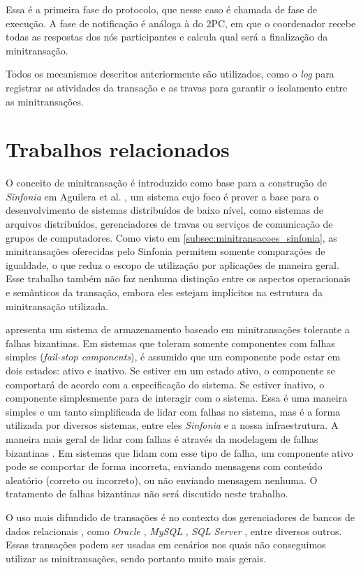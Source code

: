 \documentclass[11pt,twoside,a4paper]{book}
\begin{document}
Essa é a primeira fase do protocolo, que nesse caso é chamada de fase de execução. A fase de notificação é análoga à do 2PC, em que o coordenador recebe todas as respostas dos nós participantes e calcula qual será a finalização da minitransação.

Todos os mecanismos descritos anteriormente são utilizados, como o \emph{log} para registrar as atividades da transação e as travas para garantir o isolamento entre as minitransações.

\section{Trabalhos relacionados}
\label{sec:trabalhos_relacionados}
O conceito de minitransação é introduzido como base para a construção de \emph{Sinfonia} em Aguilera et al. \cite{sinfonia}, um sistema cujo foco é prover a base para o desenvolvimento de sistemas distribuídos de baixo nível, como sistemas de arquivos distribuídos, gerenciadores de travas ou serviços de comunicação de grupos de computadores. Como visto em \ref{subsec:minitransacoes_sinfonia}, as minitransações oferecidas pelo Sinfonia permitem somente comparações de igualdade, o que reduz o escopo de utilização por aplicações de maneira geral. Esse trabalho também não faz nenhuma distinção entre os aspectos operacionais e semânticos da transação, embora eles estejam implícitos na estrutura da minitransação utilizada.

\cite{padilha} apresenta um sistema de armazenamento baseado em minitransações tolerante a falhas bizantinas. Em sistemas que toleram somente componentes com falhas simples (\emph{fail-stop components}), é assumido que um componente pode estar em dois estados: ativo e inativo. Se estiver em um estado ativo, o componente se comportará de acordo com a especificação do sistema. Se estiver inativo, o componente simplesmente para de interagir com o sistema. Essa é uma maneira simples e um tanto simplificada de lidar com falhas no sistema, mas é a forma utilizada por diversos sistemas, entre eles \emph{Sinfonia} e a nossa infraestrutura. A maneira mais geral de lidar com falhas é através da modelagem de falhas bizantinas \cite{byzantine}. Em sistemas que lidam com esse tipo de falha, um componente ativo pode se comportar de forma incorreta, enviando mensagens com conteúdo aleatório (correto ou incorreto), ou não enviando mensagem nenhuma. O tratamento de falhas bizantinas não será discutido neste trabalho.

O uso mais difundido de transações é no contexto dos gerenciadores de bancos de dados relacionais \cite{vaca}, como \emph{Oracle} \cite{oracle}, \emph{MySQL} \cite{mysql}, \emph{SQL Server} \cite{sqlserver}, entre diversos outros. Essas transações podem ser usadas em cenários nos quais não conseguimos utilizar as minitransações, sendo portanto muito mais gerais. %
\end{document}
